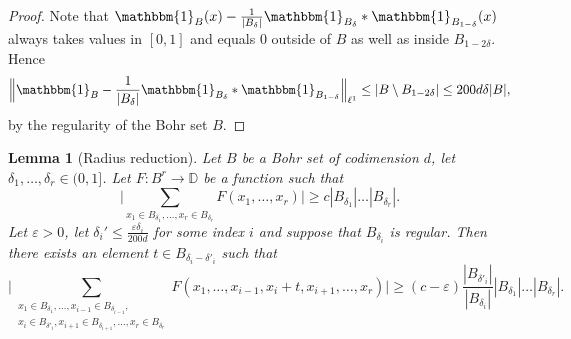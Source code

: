 \documentclass[a4paper,11pt]{article}
\numberwithin{theorem}{section}
\newtheorem{lemma}[theorem]{Lemma}
\theoremstyle{definition}
\newcommand\id{\mathbbm{1}}
\newcommand\ssk[1]{
	\substack{#1}
}
\begin{document}
\begin{proof}
    Note that $\id_B(x) - \frac{1}{|B_{\delta}|}\id_{B_\delta} \ast \id_{B_{1-\delta}}(x)$ always takes values in $[0,1]$ and equals 0 outside of $B$ as well as inside $B_{1-2\delta}$. Hence
    \[\Big\|\id_B - \frac{1}{|B_{\delta}|}\id_{B_\delta} \ast \id_{B_{1-\delta}}\Big\|_{\ell^1} \leq |B \setminus B_{1-2\delta}| \leq 200 d\delta |B|,\]
    by the regularity of the Bohr set $B$.
\end{proof}

\begin{lemma}[Radius reduction]\label{radiusReductionLemma}
    Let $B$ be a Bohr set of codimension $d$, let $\delta_1, \dots, \delta_r \in (0,1]$. Let $F : B^r \to \mathbb{D}$ be a function such that
    \[\Big|\sum_{x_1 \in B_{\delta_1}, \dots, x_r \in B_{\delta_r}} F(x_1, \dots, x_r) \Big|\geq c |B_{\delta_1}|\dots |B_{\delta_r}|.\]
    Let $\varepsilon > 0$, let $\delta_i' \leq \frac{\varepsilon \delta_i}{200d}$ for some index $i$ and suppose that $B_{\delta_i}$ is regular. Then there exists an element $t \in B_{\delta_i - \delta'_i}$ such that
    \[\Big|\sum_{\ssk{x_1 \in B_{\delta_1}, \dots, x_{i-1} \in B_{\delta_{i-1}},\\ x_i \in B_{\delta'_{i}}, x_{i+1} \in B_{\delta_{i+1}}, \dots, x_r \in B_{\delta_r}}} F(x_1, \dots, x_{i-1}, x_i + t, x_{i + 1}, \dots,  x_r) \Big| \geq (c - \varepsilon) \frac{|B_{\delta'_i}|}{|B_{\delta_i}|} |B_{\delta_1}|\dots |B_{\delta_r}|.\]
\end{lemma}
\end{document}
